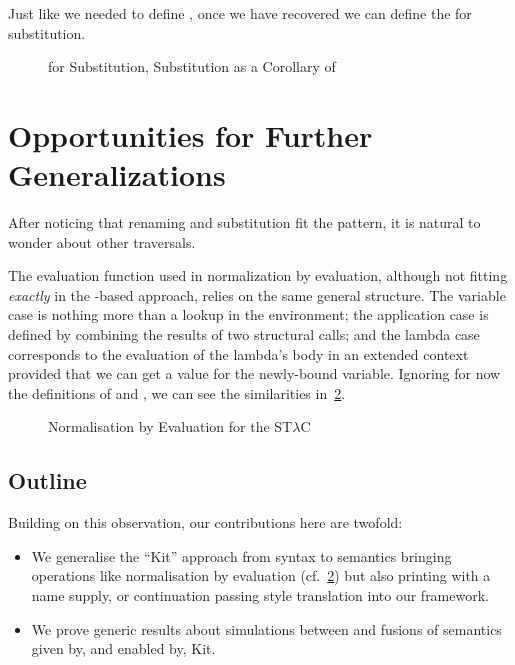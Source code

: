 Just like we needed  to define , once we have recovered 
we can define the  for substitution.

\begin{figure}[h]
\begin{minipage}{0.4\textwidth}
\end{minipage}
\begin{minipage}{0.6\textwidth}
\end{minipage}
\caption{ for Substitution, Substitution as a Corollary of \label{fig:subkit}}
\end{figure}

\section{Opportunities for Further Generalizations}

After noticing that renaming and substitution fit the pattern, it is
natural to wonder about other traversals.

The evaluation function used in normalization by evaluation, although
not fitting \emph{exactly} in the -based approach, relies on
the same general structure. The variable case is nothing more than a
lookup in the environment; the application case is defined by combining
the results of two structural calls; and the lambda case corresponds to
the evaluation of the lambda's body in an extended context provided that
we can get a value for the newly-bound variable. Ignoring for now the
definitions of  and , we can see the similarities
in~\cref{nbe}.

\begin{figure}[h]
\caption{Normalisation by Evaluation for the ST$λ$C\label{nbe}}
\end{figure}

\subsection{Outline} Building on this observation, our contributions
here are twofold:

\begin{itemize}
  \item
    We generalise the ``Kit'' approach from syntax to semantics bringing
    operations like normalisation by evaluation (cf.~\cref{nbe}) but also
    printing with a name supply, or continuation passing style translation
    into our framework.

  \item
    We prove generic results about simulations between and fusions of
    semantics given by, and enabled by, Kit.
\end{itemize}

